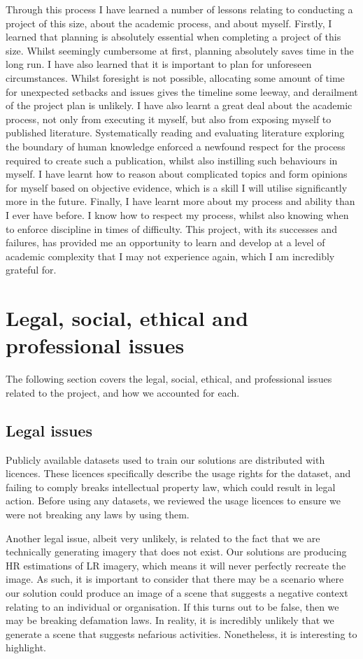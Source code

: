 \begin{appendices}
Through this process I have learned a number of lessons relating to conducting a project of this size, about the academic process, and about myself. Firstly, I learned that planning is absolutely essential when completing a project of this size. Whilst seemingly cumbersome at first, planning absolutely saves time in the long run. I have also learned that it is important to plan for unforeseen circumstances. Whilst foresight is not possible, allocating some amount of time for unexpected setbacks and issues gives the timeline some leeway, and derailment of the project plan is unlikely. I have also learnt a great deal about the academic process, not only from executing it myself, but also from exposing myself to published literature. Systematically reading and evaluating literature exploring the boundary of human knowledge enforced a newfound respect for the process required to create such a publication, whilst also instilling such behaviours in myself. I have learnt how to reason about complicated topics and form opinions for myself based on objective evidence, which is a skill I will utilise significantly more in the future. Finally, I have learnt more about my process and ability than I ever have before. I know how to respect my process, whilst also knowing when to enforce discipline in times of difficulty. This project, with its successes and failures, has provided me an opportunity to learn and develop at a level of academic complexity that I may not experience again, which I am incredibly grateful for.

\section{Legal, social, ethical and professional issues}
The following section covers the legal, social, ethical, and professional issues related to the project, and how we accounted for each.

\subsection{Legal issues}
Publicly available datasets used to train our solutions are distributed with licences. These licences specifically describe the usage rights for the dataset, and failing to comply breaks intellectual property law, which could result in legal action. Before using any datasets, we reviewed the usage licences to ensure we were not breaking any laws by using them.

Another legal issue, albeit very unlikely, is related to the fact that we are technically generating imagery that does not exist. Our solutions are producing HR estimations of LR imagery, which means it will never perfectly recreate the image. As such, it is important to consider that there may be a scenario where our solution could produce an image of a scene that suggests a negative context relating to an individual or organisation. If this turns out to be false, then we may be breaking defamation laws. In reality, it is incredibly unlikely that we generate a scene that suggests nefarious activities. Nonetheless, it is interesting to highlight.


\end{appendices}
